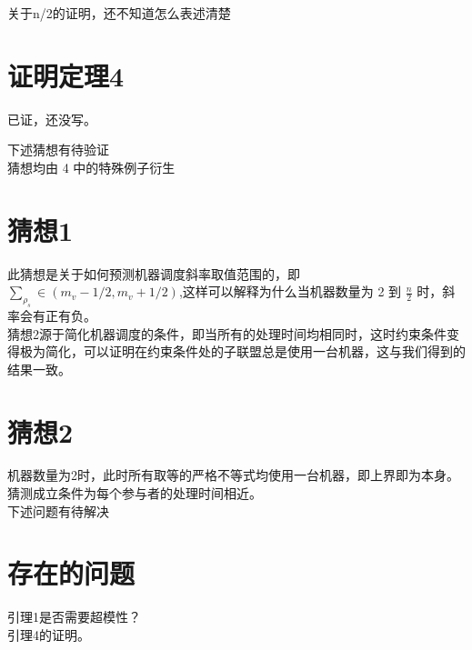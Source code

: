 \documentclass[UTF8]{article}
\begin{document}
关于n/2的证明，还不知道怎么表述清楚


\section*{证明定理4}

已证，还没写。

下述猜想有待验证   \\
猜想均由 4 中的特殊例子衍生
\section*{猜想1}
此猜想是关于如何预测机器调度斜率取值范围的，即
$\sum_{\rho_s} \in (m_v-1/2,m_v+1/2)$,这样可以解释为什么当机器数量为 2 到 $\frac{n}{2}$ 时，斜率会有正有负。\\


猜想2源于简化机器调度的条件，即当所有的处理时间均相同时，这时约束条件变得极为简化，可以证明在约束条件处的子联盟总是使用一台机器，这与我们得到的结果一致。

\section*{猜想2}

机器数量为2时，此时所有取等的严格不等式均使用一台机器，即上界即为本身。
猜测成立条件为每个参与者的处理时间相近。\\



下述问题有待解决
\section{存在的问题}
引理1是否需要超模性？   \\
引理4的证明。
\end{document}

